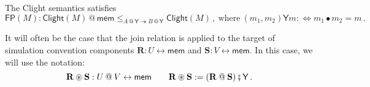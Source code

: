 \documentclass[acmsmall,screen,review,nonacm]{acmart}
\newcommand{\kw}[1]{\ensuremath{ \mathsf{#1} }}
\newcommand{\jr}{\mathsf{Y}}
\newcommand{\vcomp}{\fatsemi}
\newcommand{\sepconj}{\oast}
\begin{document}
\begin{theorem} \label{thm:clightframe}
The Clight semantics satisfies
\[
  \kw{FP}(M) :
  \kw{Clight}(M) \mathbin@ \kw{mem}
  \le_{A \mathbin@ \jr \twoheadrightarrow B \mathbin@ \jr}
  \kw{Clight}(M)
  \,,
  \: \text{where} \:
  (m_1, m_2) \mathrel{\jr} m  :\Leftrightarrow
  m_1 \bullet m_2 = m
  \,.
\]
\end{theorem}

It will often be the case that the join relation
is applied to the target of
simulation convention components
$\mathbf{R} : U \leftrightarrow \kw{mem}$ and
$\mathbf{S} : V \leftrightarrow \kw{mem}$.
In this case,
we will use the notation:
\[
  \mathbf{R} \sepconj \mathbf{S} : U \mathbin@ V \leftrightarrow \kw{mem}
  \qquad
  \mathbf{R} \sepconj \mathbf{S} :=
  (\mathbf{R} \mathbin@ \mathbf{S}) \vcomp \jr
  \,.
\]
\end{document}
